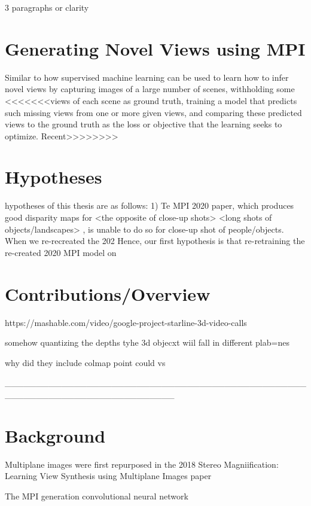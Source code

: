 3 paragraphs or clarity

\section{Generating Novel Views using MPI}

Similar to how supervised machine learning can be used to learn how to infer novel views by capturing images of a large number of scenes, withholding some
<<<<<<<views of each scene as ground truth, training a model that predicts
such missing views from one or more given views, and comparing
these predicted views to the ground truth as the loss or objective
that the learning seeks to optimize. Recent>>>>>>>>

\section{Hypotheses}

 hypotheses of this thesis are as follows:
1) Te MPI 2020 paper, which produces good disparity maps for <the opposite of close-up shots> <long shots of objects/landscapes> \cite{}, is unable to do so for close-up shot of people/objects. When we re-recreated the 202 Hence, our first hypothesis is that re-retraining the re-created 2020 MPI model on  

\section{Contributions/Overview}



https://mashable.com/video/google-project-starline-3d-video-calls

somehow quantizing the depths 
tyhe 3d objecxt wiil fall in different plab=nes

why did they include colmap point could vs 




___________________________________________________________________________




\section{Background}\label{sec1:background}

Multiplane images were first repurposed in the 2018 Stereo Magniification: Learning View Synthesis using Multiplane Images paper \cite{}

The MPI generation convolutional neural network 

